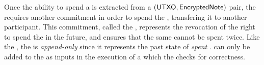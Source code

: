 
Once the ability to spend a \SecretAsset{} is extracted from a $({\textsf{UTXO}}, {\textsf{EncryptedNote}})$ pair, the \ShieldedAssetPool{} requires another commitment in order to spend the \SecretAsset{}, transfering it to another participant. This commitment, called the \VoidNumber{}, represents the revocation of the right to spend the \SecretAsset{} in the future, and ensures that the same \SecretAsset{} cannot be spent twice. Like the \UTXOSet{}, the \VoidNumberSet{} is \emph{append-only} since it represents the past state of \emph{spent} .  can only be added to the \VoidNumberSet{} as inputs in the execution of a \Transfer{} which the \Ledger{} checks for correctness.
